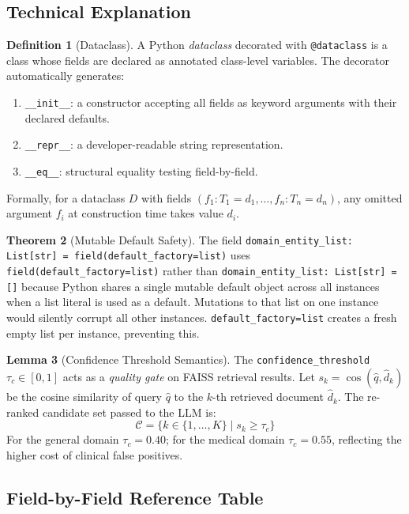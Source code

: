 \documentclass[12pt,a4paper]{article}
\theoremstyle{definition}
\newtheorem{theorem}{Theorem}[section]
\newtheorem{lemma}[theorem]{Lemma}
\newtheorem{definition}[theorem]{Definition}
\theoremstyle{remark}
\begin{document}
\subsection{Technical Explanation}

\begin{definition}[Dataclass]
A Python \emph{dataclass} decorated with \texttt{@dataclass} is a class
whose fields are declared as annotated class-level variables.
The decorator automatically generates:
\begin{enumerate}
  \item \texttt{\_\_init\_\_}: a constructor accepting all fields as keyword arguments with their declared defaults.
  \item \texttt{\_\_repr\_\_}: a developer-readable string representation.
  \item \texttt{\_\_eq\_\_}: structural equality testing field-by-field.
\end{enumerate}
Formally, for a dataclass $D$ with fields
$(f_1 : T_1 = d_1, \ldots, f_n : T_n = d_n)$,
any omitted argument $f_i$ at construction time takes value $d_i$.
\end{definition}

\begin{theorem}[Mutable Default Safety]
The field \texttt{domain\_entity\_list: List[str] = field(default\_factory=list)}
uses \texttt{field(default\_factory=list)} rather than
\texttt{domain\_entity\_list: List[str] = []}
because Python shares a single mutable default object across all instances
when a list literal is used as a default.
Mutations to that list on one instance would silently corrupt all other instances.
\texttt{default\_factory=list} creates a fresh empty list per instance, preventing this.
\end{theorem}

\begin{lemma}[Confidence Threshold Semantics]
The \texttt{confidence\_threshold} $\tau_c \in [0,1]$ acts as a
\emph{quality gate} on FAISS retrieval results.
Let $s_k = \cos(\hat{q}, \hat{d}_k)$ be the cosine similarity of query
$\hat{q}$ to the $k$-th retrieved document $\hat{d}_k$.
The re-ranked candidate set passed to the LLM is:
\[
  \mathcal{C} = \{k \in \{1,\ldots,K\} \mid s_k \geq \tau_c\}
\]
For the general domain $\tau_c = 0.40$; for the medical domain
$\tau_c = 0.55$, reflecting the higher cost of clinical false positives.
\end{lemma}

\subsection{Field-by-Field Reference Table}
\end{document}
